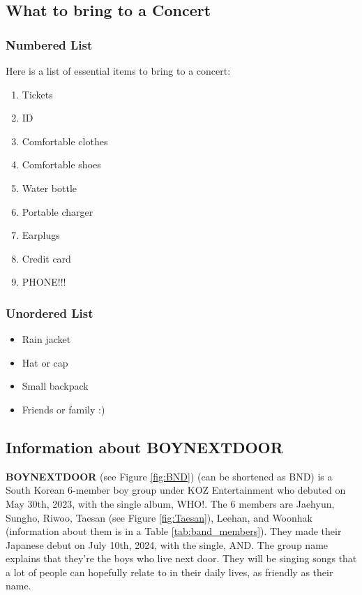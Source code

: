 
\newpage
\subsection{What to bring to a Concert}
\subsubsection{Numbered List}

Here is a list of essential items to bring to a concert:

\begin{enumerate}
    \item  Tickets
    \item ID
    \item Comfortable clothes
    \item Comfortable shoes
    \item Water bottle
    \item Portable charger
    \item Earplugs
    \item Credit card
    \item PHONE!!!

\end{enumerate}

\subsubsection{Unordered List}
\begin{itemize}
    \item Rain jacket
    \item Hat or cap
    \item Small backpack
    \item Friends or family :)
\end{itemize}

\subsection{Information about BOYNEXTDOOR}

\onehalfspacing 

\textbf{BOYNEXTDOOR} (see Figure \ref{fig:BND}) (can be shortened as BND) is a South Korean 6-member boy group under KOZ Entertainment who debuted on May 30th, 2023, with the single album, WHO!. The 6 members are Jaehyun, Sungho, Riwoo, Taesan (see Figure  \ref{fig:Taesan}), Leehan, and Woonhak (information about them is in a Table \ref{tab:band_members}). They made their Japanese debut on July 10th, 2024, with the single, AND. The group name explains that they’re the boys who live next door. They will be singing songs that a lot of people can hopefully relate to in their daily lives, as friendly as their name. \par

